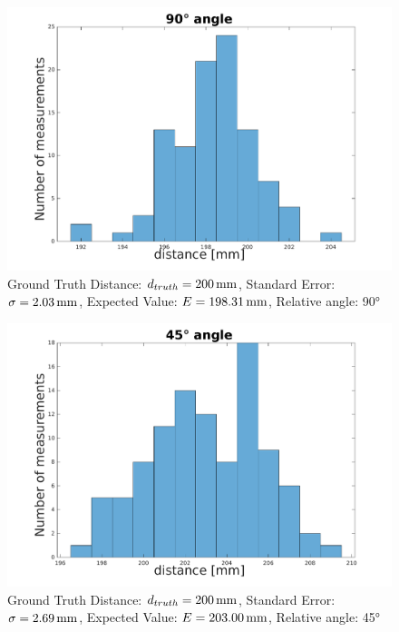 \begin{figure}
	\centering
	\includegraphics[width=0.9\linewidth]{pictures/plot_angles_90.pdf}
	\caption{Ground Truth Distance: $d_{truth}= \unit[200]{mm}$, Standard Error: $\sigma=\unit[2.03]{mm}$, Expected Value: $E=\unit[198.31]{mm}$, Relative angle: 90°}
	\label{fig:angle90}
\end{figure}
\begin{figure}
	\centering
	\includegraphics[width=0.9\linewidth]{pictures/plot_angles_45.pdf}
	\caption{Ground Truth Distance: $d_{truth}= \unit[200]{mm}$, Standard Error: $\sigma=\unit[2.69]{mm}$, Expected Value: $E=\unit[203.00]{mm}$, Relative angle: 45°}
	\label{fig:angle45}
\end{figure}
